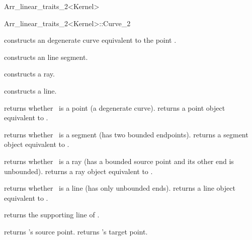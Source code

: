 \begin{ccRefClass}{Arr_linear_traits_2<Kernel>}
\begin{ccClass}{Arr_linear_traits_2<Kernel>::Curve_2}

\ccTypes

\ccGlue
{}
\ccGlue
{}
\ccGlue
{}

\ccCreation
{}

    {constructs an degenerate curve equivalent to the point .}

    {constructs an line segment.}

    {constructs a ray.}

    {constructs a line.}

\ccAccessFunctions

  {returns whether \ccVar\ is a point (a degenerate curve).}
\ccGlue
{}
  {returns a point object equivalent to \ccVar.
   }

  {returns whether \ccVar\ is a segment (has two bounded endpoints).}
\ccGlue
{}
  {returns a segment object equivalent to \ccVar.
   }

  {returns whether \ccVar\ is a ray (has a bounded source point and its
   other end is unbounded).}
\ccGlue
{}
  {returns a ray object equivalent to \ccVar.
   }

  {returns whether \ccVar\ is a line (has only unbounded ends).}
\ccGlue
{}
  {returns a line object equivalent to \ccVar.
   }

  {returns the supporting line of \ccVar.
   }

  {returns \ccVar's source point.
   }
\ccGlue
{}
  {returns \ccVar's target point.
   }

\end{ccClass}

\end{ccRefClass}

\ccRefPageEnd
